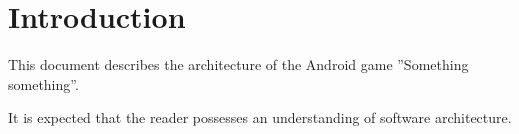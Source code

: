 \section{Introduction} 
\label{sec:introduction}

This document describes the architecture of the Android game ''Something something''. %

It is expected that the reader possesses an understanding of software architecture.